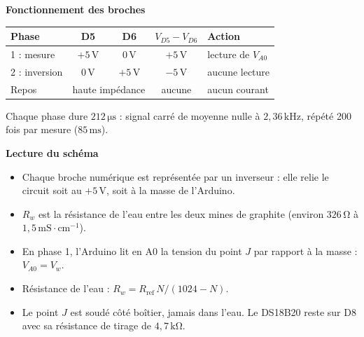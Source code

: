 \documentclass[11pt,a4paper]{article}
\newcommand{\U}[1]{\,\mathrm{#1}}
\begin{document}
\newpage
\vspace{3mm}
\begin{minipage}[t]{0.47\linewidth}
\textbf{Fonctionnement des broches}

\vspace{1mm}
\begin{tabular}{l c c c l}
\toprule
\textbf{Phase} & \textbf{D5} & \textbf{D6} & \textbf{$V_{D5} - V_{D6}$} & \textbf{Action} \\
\midrule
1 : mesure & $+5\U{V}$ & $0\U{V}$ & $+5\U{V}$ & lecture de $V_{A0}$ \\
2 : inversion & $0\U{V}$ & $+5\U{V}$ & $-5\U{V}$ & aucune lecture \\
Repos & \multicolumn{2}{c}{haute impédance} & aucune & aucun courant \\
\bottomrule
\end{tabular}

\vspace{2mm}
Chaque phase dure $212\U{\mu s}$ : signal carré de moyenne nulle à $2{,}36\U{kHz}$, répété 200 fois par mesure ($85\U{ms}$).
\end{minipage}
\hfill
\begin{minipage}[t]{0.49\linewidth}
\textbf{Lecture du schéma}

\vspace{1mm}
\begin{itemize}\setlength{\itemsep}{1pt}
\item Chaque broche numérique est représentée par un inverseur : elle relie le circuit soit au $+5\U{V}$, soit à la masse de l'Arduino.
\item $R_w$ est la résistance de l'eau entre les deux mines de graphite (environ $326\U{\Omega}$ à $1{,}5\U{mS \cdot cm^{-1}}$).
\item En phase 1, l'Arduino lit en A0 la tension du point $J$ par rapport à la masse : $V_{A0} = V_w$.
\item Résistance de l'eau : $R_w = R_{\text{ref}} \, N / (1024 - N)$.
\item Le point $J$ est soudé côté boîtier, jamais dans l'eau. Le DS18B20 reste sur D8 avec sa résistance de tirage de $4{,}7\U{k\Omega}$.
\end{itemize}
\end{minipage}
\end{document}
